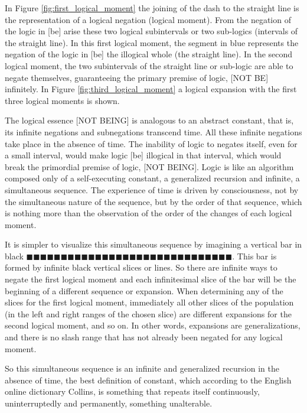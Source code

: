In Figure \ref{fig:first_logical_moment} the joining of the dash to the straight line is the representation of a logical negation (logical moment). From the negation of the logic in [be] arise these two logical subintervals or two sub-logics (intervals of the straight line). In this first logical moment, the segment in blue represents the negation of the logic in [be] the illogical whole (the straight line). In the second logical moment, the two subintervals of the straight line or sub-logic are able to negate themselves, guaranteeing the primary premise of logic, [NOT BE] infinitely. In Figure \ref{fig:third_logical_moment} a logical expansion with the first three logical moments is shown.

The logical essence [NOT BEING] is analogous to an abstract constant, that is, its infinite negations and subnegations transcend time. All these infinite negations take place in the absence of time. The inability of logic to negates itself, even for a small interval, would make logic [be] illogical in that interval, which would break the primordial premise of logic, [NOT BEING]. Logic is like an algorithm composed only of a self-executing constant, a generalized recursion and infinite, a simultaneous sequence. The experience of time is driven by consciousness, not by the simultaneous nature of the sequence, but by the order of that sequence, which is nothing more than the observation of the order of the changes of each logical moment.

It is simpler to visualize this simultaneous sequence by imagining a vertical bar in black $\!\blacksquare\!\blacksquare\!\blacksquare\!\blacksquare\!\blacksquare\!\blacksquare\!\blacksquare\!\blacksquare\!\blacksquare\!\blacksquare\!\blacksquare\!\blacksquare\!\blacksquare\!\blacksquare\!\blacksquare\!\blacksquare\!\blacksquare\!\blacksquare\!\blacksquare\!\blacksquare\!\blacksquare\!\blacksquare\!\blacksquare\!\blacksquare\!\blacksquare\!\blacksquare\!\blacksquare\!\blacksquare\!\blacksquare\!\blacksquare$. This bar is formed by infinite black vertical slices or lines. So there are infinite ways to negate the first logical moment and each infinitesimal slice of the bar will be the beginning of a different sequence or expansion. When determining any of the slices for the first logical moment, immediately all other slices of the population (in the left and right ranges of the chosen slice) are different expansions for the second logical moment, and so on. In other words, expansions are generalizations, and there is no slash range that has not already been negated for any logical moment.

So this simultaneous sequence is an infinite and generalized recursion in the absence of time, the best definition of constant, which according to the English online dictionary Collins\cite{dic_constant}, is something that repeats itself continuously, uninterruptedly and permanently, something unalterable.







